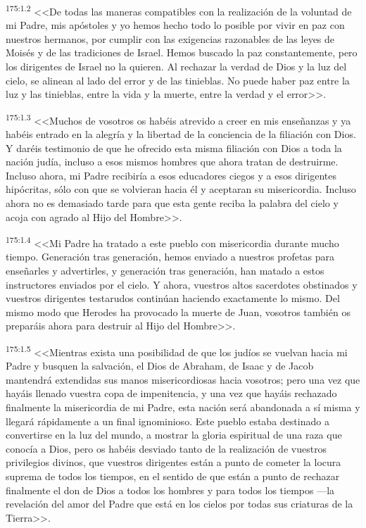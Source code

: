\par 
\textsuperscript{175:1.2} <<De todas las maneras compatibles con la realización de la voluntad de mi Padre, mis apóstoles y yo hemos hecho todo lo posible por vivir en paz con nuestros hermanos, por cumplir con las exigencias razonables de las leyes de Moisés y de las tradiciones de Israel. Hemos buscado la paz constantemente, pero los dirigentes de Israel no la quieren. Al rechazar la verdad de Dios y la luz del cielo, se alinean al lado del error y de las tinieblas. No puede haber paz entre la luz y las tinieblas, entre la vida y la muerte, entre la verdad y el error>>.

\par 
\textsuperscript{175:1.3} <<Muchos de vosotros os habéis atrevido a creer en mis enseñanzas y ya habéis entrado en la alegría y la libertad de la conciencia de la filiación con Dios. Y daréis testimonio de que he ofrecido esta misma filiación con Dios a toda la nación judía, incluso a esos mismos hombres que ahora tratan de destruirme. Incluso ahora, mi Padre recibiría a esos educadores ciegos y a esos dirigentes hipócritas, sólo con que se volvieran hacia él y aceptaran su misericordia. Incluso ahora no es demasiado tarde para que esta gente reciba la palabra del cielo y acoja con agrado al Hijo del Hombre>>.

\par 
\textsuperscript{175:1.4} <<Mi Padre ha tratado a este pueblo con misericordia durante mucho tiempo. Generación tras generación, hemos enviado a nuestros profetas para enseñarles y advertirles, y generación tras generación, han matado a estos instructores enviados por el cielo. Y ahora, vuestros altos sacerdotes obstinados y vuestros dirigentes testarudos continúan haciendo exactamente lo mismo. Del mismo modo que Herodes ha provocado la muerte de Juan, vosotros también os preparáis ahora para destruir al Hijo del Hombre>>.

\par 
\textsuperscript{175:1.5} <<Mientras exista una posibilidad de que los judíos se vuelvan hacia mi Padre y busquen la salvación, el Dios de Abraham, de Isaac y de Jacob mantendrá extendidas sus manos misericordiosas hacia vosotros; pero una vez que hayáis llenado vuestra copa de impenitencia, y una vez que hayáis rechazado finalmente la misericordia de mi Padre, esta nación será abandonada a sí misma y llegará rápidamente a un final ignominioso. Este pueblo estaba destinado a convertirse en la luz del mundo, a mostrar la gloria espiritual de una raza que conocía a Dios, pero os habéis desviado tanto de la realización de vuestros privilegios divinos, que vuestros dirigentes están a punto de cometer la locura suprema de todos los tiempos, en el sentido de que están a punto de rechazar finalmente el don de Dios a todos los hombres y para todos los tiempos ---la revelación del amor del Padre que está en los cielos por todas sus criaturas de la Tierra>>.

